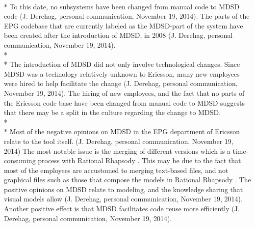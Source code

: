 \documentclass[final_report_innit.tex]{subfiles}
\begin{document}
\\* 
To this date, no subsystems have been changed from manual code to MDSD code (J. Derehag, personal communication, November 19, 2014). The parts of the EPG codebase that are currently labeled as the MDSD-part of the system have been created after the introduction of MDSD, in 2008 (J. Derehag, personal communication, November 19, 2014). 
\\* 
\\* 
The introduction of MDSD did not only involve technological changes. Since MDSD was a technology relatively unknown to Ericsson, many new employees were hired to help facilitate the change (J. Derehag, personal communication, November 19, 2014). The hiring of new employees, and the fact that no parts of the Ericsson code base have been changed from manual code to MDSD suggests that there may be a split in the culture regarding the change to MDSD. 
\\* 
\\* 
Most of the negative opinions on MDSD in the EPG department of Ericsson relate to the tool \cite{rrf} itself. (J. Derehag, personal communication, November 19, 2014) The most notable issue is the merging of different versions which is a time-consuming process with Rational Rhapsody \cite{rrf}. This may be due to the fact that most of the employees are accustomed to merging text-based files, and not graphical files such as those that compose the models in Rational Rhapsody \cite{rrf}. The positive opinions on MDSD relate to modeling, and the knowledge sharing that visual models allow (J. Derehag, personal communication, November 19, 2014). Another positive effect is that MDSD facilitates code reuse more efficiently (J. Derehag, personal communication, November 19, 2014). 
\end{document}
